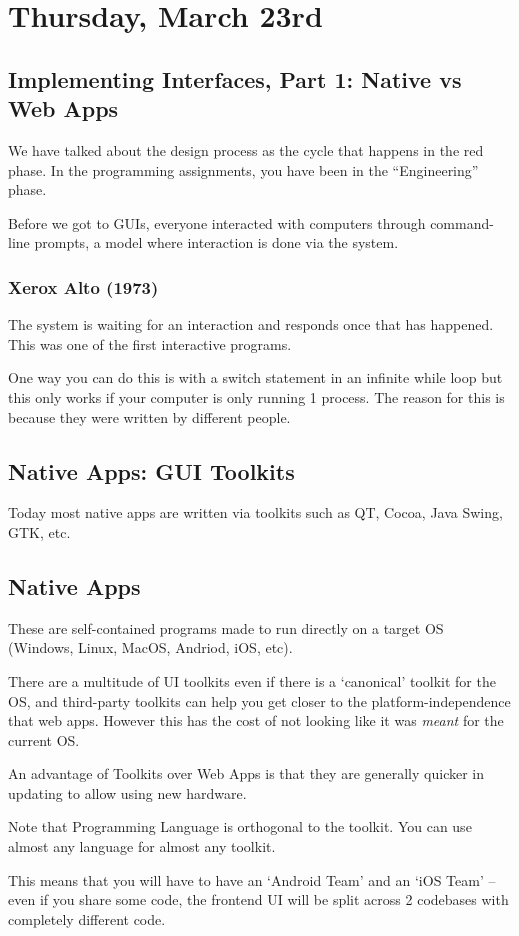 \section{Thursday, March 23rd}
\subsection{Implementing Interfaces, Part 1: Native vs Web Apps}
We have talked about the design process as the cycle that happens in the red phase. In the programming assignments, you have been in the ``Engineering'' phase.

Before we got to GUIs, everyone interacted with computers through command-line prompts, a model where interaction is done via the system.

\subsubsection{Xerox Alto (1973)}
The system is waiting for an interaction and responds once that has happened. This was one of the first interactive programs.

One way you can do this is with a switch statement in an infinite while loop but this only works if your computer is only running 1 process. The reason for this is because they were written by different people.

\subsection{Native Apps: GUI Toolkits}
Today most native apps are written via toolkits such as QT, Cocoa, Java Swing, GTK, etc.

\subsection{Native Apps}
These are self-contained programs made to run directly on a target OS (Windows, Linux, MacOS, Andriod, iOS, etc).

There are a multitude of UI toolkits even if there is a `canonical' toolkit for the OS, and third-party toolkits can help you get closer to the platform-independence that web apps. However this has the cost of not looking like it was \textit{meant} for the current OS.

An advantage of Toolkits over Web Apps is that they are generally quicker in updating to allow using new hardware.

Note that Programming Language is orthogonal to the toolkit. You can use almost any language for almost any toolkit.
\begin{important}
This means that you will have to have an `Android Team' and an `iOS Team' -- even if you share some code, the frontend UI will be split across 2 codebases with completely different code.
\end{important}

